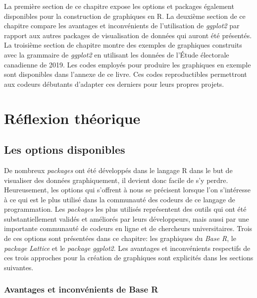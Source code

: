 \documentclass[
  letterpaper,
  DIV=11,
  numbers=noendperiod]{scrreprt}
\begin{document}
La première section de ce chapitre expose les options et packages
également disponibles pour la construction de graphiques en R. La
deuxième section de ce chapitre compare les avantages et inconvénients
de l'utilisation de \emph{ggplot2} par rapport aux autres packages de
visualisation de données qui auront été présentés. La troisième section
de chapitre montre des exemples de graphiques construits avec la
grammaire de \emph{ggplot2} en utilisant les données de l'Étude
électorale canadienne de 2019. Les codes employés pour produire les
graphiques en exemple sont disponibles dans l'annexe de ce livre. Ces
codes reproductibles permettront aux codeurs débutants d'adapter ces
derniers pour leurs propres projets.

\hypertarget{ruxe9flexion-thuxe9orique-2}{%
\section{Réflexion théorique}\label{ruxe9flexion-thuxe9orique-2}}

\hypertarget{les-options-disponibles}{%
\subsection{Les options disponibles}\label{les-options-disponibles}}

De nombreux \emph{packages} ont été développés dans le langage R dans le
but de visualiser des données graphiquement, il devient donc facile de
s'y perdre. Heureusement, les options qui s'offrent à nous se précisent
lorsque l'on s'intéresse à ce qui est le plus utilisé dans la communauté
des codeurs de ce langage de programmation. Les \emph{packages} les plus
utilisés représentent des outils qui ont été substantiellement validés
et améliorés par leurs développeurs, mais aussi par une importante
communauté de codeurs en ligne et de chercheurs universitaires. Trois de
ces options sont présentées dans ce chapitre: les graphiques du
\emph{Base R}, le \emph{package} \emph{Lattice} et le \emph{package}
\emph{ggplot2}. Les avantages et inconvénients respectifs de ces trois
approches pour la création de graphiques sont explicités dans les
sections suivantes.

\hypertarget{avantages-et-inconvuxe9nients-de-base-r}{%
\subsubsection{Avantages et inconvénients de Base
R}\label{avantages-et-inconvuxe9nients-de-base-r}}
\end{document}
